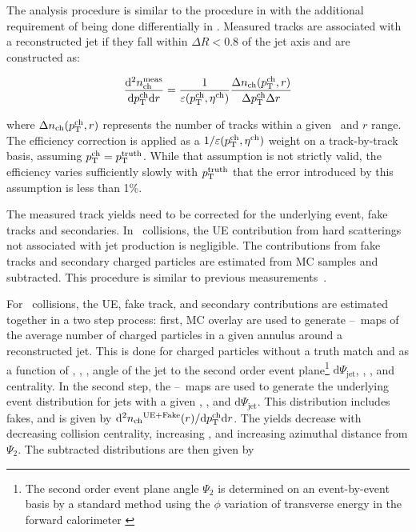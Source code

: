
The analysis procedure is similar to the procedure in \cite{Aaboud:2018hpb} with the additional requirement of being done differentially in \rvar. Measured tracks are associated with a reconstructed jet if they fall within $\Delta R < 0.8$ of the jet axis and are constructed as:

\begin{eqnarray}
\dfrac{\mathrm{d}^{2} \mbox{$n_{\mathrm{ch}}^{\mathrm{meas}}$} }{ \mathrm{d} \mbox{$p_{\mathrm{T}}^{\mathrm{ch}}$} \mathrm{d} r} = \frac{1}{\varepsilon(\mbox{$p_{\mathrm{T}}^{\mathrm{ch}}$},\mbox{$\eta^{\mathrm{ch}}$})} \frac{\Delta \mbox{$n_{\mathrm{ch}}$}( \mbox{$p_{\mathrm{T}}^{\mathrm{ch}}$}, r)}{ \Delta\mbox{$p_{\mathrm{T}}^{\mathrm{ch}}$} \Delta r}
\end{eqnarray}

where $\Delta \mbox{$n_{\mathrm{ch}}$} (\mbox{$p_{\mathrm{T}}^{\mathrm{ch}}$}, r)$ represents the number of tracks within a given \pttrk\ and $r$ range. The efficiency correction is applied as a $1/\varepsilon(\mbox{$p_{\mathrm{T}}^{\mathrm{ch}}$},\mbox{$\eta^{\mathrm{ch}}$})$ weight on a track-by-track basis, assuming $\mbox{$p_{\mathrm{T}}^{\mathrm{ch}}$} = \mbox{$p_{\mathrm{T}}^{\mathrm{truth}}$}$. While that assumption is not strictly valid, the efficiency varies sufficiently slowly with $\mbox{$p_{\mathrm{T}}^{\mathrm{truth}}$}$ that the error
introduced by this assumption is less than 1\%.

The measured track yields need to be corrected for the underlying event, fake tracks and secondaries. In \pp\ collisions, the UE contribution from hard scatterings not associated with jet production is negligible. The contributions from fake tracks and secondary charged particles are estimated from MC samples and subtracted. This procedure is similar to previous measurements~\cite{Aaboud:2017tke,Aaboud:2018hpb}.

For \pbpb\ collisions, the UE, fake track, and secondary contributions are estimated together in a two step process: first, MC overlay are used to generate \etajet--\phijet\ maps of the average number of charged particles in a given annulus around a reconstructed jet. This is done for charged particles without a truth match and as a function of \ptjet, \etajet, \phijet, angle of the jet to the second order event plane\footnote{The second order event plane angle $\Psi_2$ is determined on an event-by-event basis by a standard method using the $\phi$ variation of transverse energy in the forward calorimeter \cite{ATLAS:2012at}} $ \mathrm{d}\Psi_{\mathrm{jet}}$, \rvar, \pttrk, and centrality. In the second step, the \etajet--\phijet\ maps are used to generate the underlying event distribution for jets with a given \etajet, \phijet, and $\mathrm{d}\Psi_{\mathrm{jet}}$. This distribution includes fakes, and is given by \mbox{$\mathrm{d}^2 \mbox{$n_{\mathrm{ch}}$}^{\mathrm{UE+Fake}}(r) / \mathrm{d} \mbox{$p_{\mathrm{T}}^{\mathrm{ch}}$} \mathrm{d} r$}. The yields decrease with decreasing collision centrality, increasing \pttrk, and increasing azimuthal distance from $\Psi_2$. The subtracted distributions are then given by 

